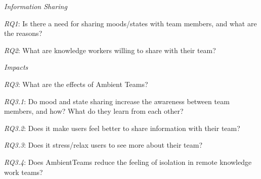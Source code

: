 


\bigskip\noindent\textit{Information Sharing}

\smallskip\noindent\textit{RQ1}: Is there a need for sharing moods/states with team members, and what are the reasons?

\smallskip\noindent\textit{RQ2}: What are knowledge workers willing to share with their team?

\medskip\noindent\textit{Impacts}

\smallskip\noindent\textit{RQ3}: What are the effects of Ambient Teams?

\setlength{\leftskip}{0.5cm}
\smallskip\noindent\textit{RQ3.1}: Do mood and state sharing increase the awareness between team members, and how? What do they learn from each other?

\smallskip\noindent\textit{RQ3.2}: Does it make users feel better to share information with their team?

\smallskip\noindent\textit{RQ3.3}: Does it stress/relax users to see more about their team?

\smallskip\noindent\textit{RQ3.4}: Does AmbientTeams reduce the feeling of isolation in remote knowledge work teams?

